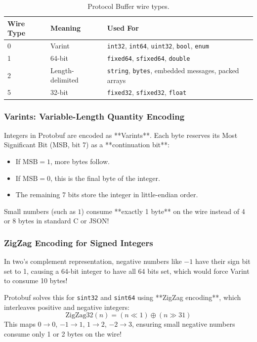 \begin{table}[htbp]
\centering
\small\sffamily
\begin{tabular}{@{}lll@{}}
\toprule
\textbf{Wire Type} & \textbf{Meaning} & \textbf{Used For} \\ \midrule
0 & Varint & \texttt{int32}, \texttt{int64}, \texttt{uint32}, \texttt{bool}, \texttt{enum} \\
1 & 64-bit & \texttt{fixed64}, \texttt{sfixed64}, \texttt{double} \\
2 & Length-delimited & \texttt{string}, \texttt{bytes}, embedded messages, packed arrays \\
5 & 32-bit & \texttt{fixed32}, \texttt{sfixed32}, \texttt{float} \\ \bottomrule
\end{tabular}
\caption{Protocol Buffer wire types.}
\label{tab:protobuf-wire}
\end{table}

\subsubsection{Varints: Variable-Length Quantity Encoding}
Integers in Protobuf are encoded as **Varints**. Each byte reserves its Most Significant Bit (MSB, bit 7) as a **continuation bit**:
\begin{itemize}[leftmargin=15pt]
  \item If $\text{MSB} = 1$, more bytes follow.
  \item If $\text{MSB} = 0$, this is the final byte of the integer.
  \item The remaining 7 bits store the integer in little-endian order.
\end{itemize}
Small numbers (such as $1$) consume **exactly 1 byte** on the wire instead of 4 or 8 bytes in standard C or JSON!

\subsubsection{ZigZag Encoding for Signed Integers}
In two's complement representation, negative numbers like $-1$ have their sign bit set to 1, causing a 64-bit integer to have all 64 bits set, which would force Varint to consume 10 bytes!

Protobuf solves this for \texttt{sint32} and \texttt{sint64} using **ZigZag encoding**, which interleaves positive and negative integers:
$$\text{ZigZag32}(n) = (n \ll 1) \oplus (n \gg 31)$$
This maps $0 \rightarrow 0$, $-1 \rightarrow 1$, $1 \rightarrow 2$, $-2 \rightarrow 3$, ensuring small negative numbers consume only 1 or 2 bytes on the wire!

